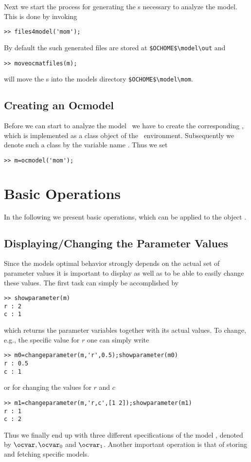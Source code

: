 Next we start the process for generating the \mfile s necessary to analyze the model. This is done by invoking
\begin{lstlisting}
>> files4model('mom');
\end{lstlisting}
By default the such generated files are stored at \lstinline+$OCHOME$\model\out+ and
\begin{lstlisting}
>> moveocmatfiles(m);
\end{lstlisting}
will move the \mfile s into the models directory \lstinline+$OCHOME$\model\mom+.

\subsection{Creating an Ocmodel}
Before we can start to analyze the model \MOM\ we have to create the corresponding \ocmodel, which is implemented as a class object of the \MATL\ environment. Subsequently we denote such a class by the variable name \ocvar. Thus we set
\begin{lstlisting}
>> m=ocmodel('mom');
\end{lstlisting}

\section{Basic Operations}
\label{sec:basic_op}
In the following we present basic operations, which can be applied to the object \ocvar.

\subsection{Displaying/Changing the Parameter Values}
Since the models optimal behavior strongly depends on the actual set of parameter values it is important to display as well as to be able to easily change these values. The first task can simply be accomplished by
\begin{lstlisting}
>> showparameter(m)
r : 2
c : 1
\end{lstlisting}
which returns the parameter variables together with its actual values. To change, e.g., the specific value for $r$ one can simply write
\begin{lstlisting}
>> m0=changeparameter(m,'r',0.5);showparameter(m0)
r : 0.5
c : 1
\end{lstlisting}
or for changing the values for  $r$ and  $c$
\begin{lstlisting}
>> m1=changeparameter(m,'r,c',[1 2]);showparameter(m1)
r : 1
c : 2
\end{lstlisting}
Thus we finally end up with three different specifications of the model \MOM, denoted by $\ocvar, \ocvar_0$ and $\ocvar_1$. Another important operation is that of storing and fetching specific models.

